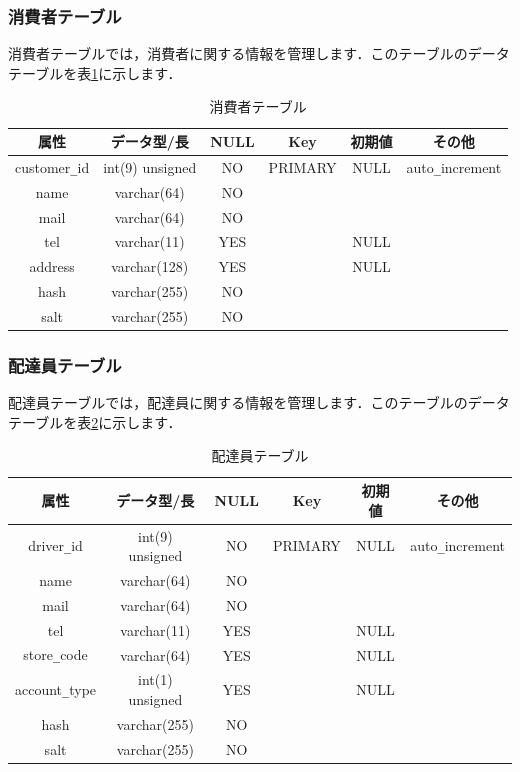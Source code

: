 \documentclass[a4j,titlepage]{jarticle}
\begin{document}
\subsubsection{消費者テーブル}
消費者テーブルでは，消費者に関する情報を管理します．このテーブルのデータテーブルを表\ref{customer}に示します．
\begin{table}[htb]
  \caption{消費者テーブル}
  \label{customer}
  \begin{center}
    \begin{tabular}{|c|c|c|c|c|c|} \hline
      属性 & データ型/長 & NULL & Key & 初期値 & その他 \\ \hline \hline
      customer\verb|_|id & int(9) unsigned & NO & PRIMARY & NULL & auto\verb|_|increment\\ \hline
      name & varchar(64) & NO &   &  & \\ \hline
      mail & varchar(64) & NO &   &  & \\ \hline
      tel & varchar(11) & YES &   & NULL & \\ \hline
      address & varchar(128) & YES &   & NULL & \\ \hline
      hash & varchar(255) & NO &   &  & \\ \hline
      salt & varchar(255) & NO &   &  & \\ \hline
    \end{tabular}
  \end{center}
\end{table}

\subsubsection{配達員テーブル}
配達員テーブルでは，配達員に関する情報を管理します．このテーブルのデータテーブルを表\ref{driver}に示します．
\begin{table}[htb]
  \caption{配達員テーブル}
  \label{driver}
  \begin{center}
    \begin{tabular}{|c|c|c|c|c|c|} \hline
      属性 & データ型/長 & NULL & Key & 初期値 & その他 \\ \hline \hline
      driver\verb|_|id & int(9) unsigned & NO & PRIMARY & NULL & auto\verb|_|increment\\ \hline
      name & varchar(64) & NO &   &  & \\ \hline
      mail & varchar(64) & NO &  &  & \\ \hline
      tel & varchar(11) & YES &  & NULL & \\ \hline
      store\verb|_|code & varchar(64) & YES &   & NULL & \\ \hline
      account\verb|_|type & int(1) unsigned & YES &   & NULL & \\ \hline
      hash & varchar(255) & NO &   &  & \\ \hline
      salt & varchar(255) & NO &   &  & \\ \hline
    \end{tabular}
  \end{center}
\end{table}
\end{document}
